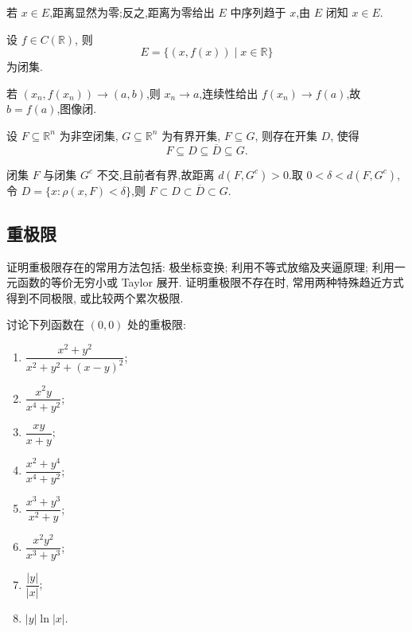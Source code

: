 \begin{solution}
    若 $x\in E$,距离显然为零;反之,距离为零给出 $E$ 中序列趋于 $x$,由 $E$ 闭知 $x\in E$.
\end{solution}

\begin{example}
    设 $f\in C(\mathbb{R})$, 则
    \[
        E=\{(x,f(x))\mid x\in\mathbb{R}\}
    \]
    为闭集.
\end{example}
\exampleblank

\begin{solution}
    若 $(x_n,f(x_n))\to(a,b)$,则 $x_n\to a$,连续性给出 $f(x_n)\to f(a)$,故 $b=f(a)$,图像闭.
\end{solution}

\begin{example}
    设 $F\subseteq\mathbb{R}^n$ 为非空闭集, $G\subseteq\mathbb{R}^n$ 为有界开集, $F\subseteq G$, 则存在开集 $D$, 使得
    \[
        F\subseteq D\subseteq\overline D\subseteq G.
    \]
\end{example}
\exampleblank

\begin{solution}
    闭集 $F$ 与闭集 $G^c$ 不交,且前者有界,故距离 $d(F,G^c)>0$.取 $0<\delta<d(F,G^c)$,令 $D=\{x:\rho(x,F)<\delta\}$,则 $F\subset D\subset\overline D\subset G$.
\end{solution}



\subsection{重极限}

证明重极限存在的常用方法包括: 极坐标变换; 利用不等式放缩及夹逼原理; 利用一元函数的等价无穷小或 Taylor 展开. 证明重极限不存在时, 常用两种特殊趋近方式得到不同极限, 或比较两个累次极限.

\begin{example}
    讨论下列函数在 $(0,0)$ 处的重极限:
    \begin{enumerate}
        \item $\displaystyle\dfrac{x^2+y^2}{x^2+y^2+(x-y)^2}$;
        \item $\displaystyle\dfrac{x^2y}{x^4+y^2}$;
        \item $\displaystyle\dfrac{xy}{x+y}$;
        \item $\displaystyle\dfrac{x^2+y^4}{x^4+y^2}$;
        \item $\displaystyle\dfrac{x^3+y^3}{x^2+y}$;
        \item $\displaystyle\dfrac{x^2y^2}{x^3+y^3}$;
        \item $\displaystyle\dfrac{|y|}{|x|}$;
        \item $|y|\ln|x|$.
    \end{enumerate}
\end{example}
\exampleblank

